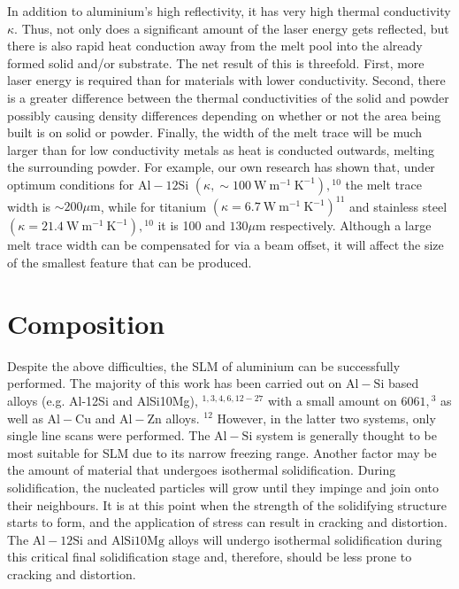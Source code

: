 \documentclass[10pt]{article}
\begin{document}
In addition to aluminium's high reflectivity, it has very high thermal conductivity $\kappa$. Thus, not only does a significant amount of the laser energy gets reflected, but there is also rapid heat conduction away from the melt pool into the already formed solid and/or substrate. The net result of this is threefold. First, more laser energy is required than for materials with lower conductivity. Second, there is a greater difference between the thermal conductivities of the solid and powder possibly causing density differences depending on whether or not the area being built is on solid or powder. Finally, the width of the melt trace will be much larger than for low conductivity metals as heat is conducted outwards, melting the surrounding powder. For example, our own research has shown that, under optimum conditions for $\mathrm{Al}-12 \mathrm{Si}$ $\left(\kappa, \sim 100 \mathrm{~W} \mathrm{~m}^{-1} \mathrm{~K}^{-1}\right),{ }^{10}$ the melt trace width is $\sim 200 \mu \mathrm{m}$, while for titanium $\left(\kappa=6.7 \mathrm{~W} \mathrm{~m}^{-1} \mathrm{~K}^{-1}\right)^{11}$ and stainless steel $\left(\kappa=21.4 \mathrm{~W} \mathrm{~m}^{-1} \mathrm{~K}^{-1}\right),{ }^{10}$ it is 100 and $130 \mu \mathrm{m}$ respectively. Although a large melt trace width can be compensated for via a beam offset, it will affect the size of the smallest feature that can be produced.

\section*{Composition}
Despite the above difficulties, the SLM of aluminium can be successfully performed. The majority of this work has been carried out on $\mathrm{Al}-\mathrm{Si}$ based alloys (e.g. Al-12Si and AlSi10Mg), ${ }^{1,3,4,6,12-27}$ with a small amount on $6061,{ }^{3}$ as well as $\mathrm{Al}-\mathrm{Cu}$ and $\mathrm{Al}-\mathrm{Zn}$ alloys. ${ }^{12}$ However, in the latter two systems, only single line scans were performed. The $\mathrm{Al}-\mathrm{Si}$ system is generally thought to be most suitable for SLM due to its narrow freezing range. Another factor may be the amount of material that undergoes isothermal solidification. During solidification, the nucleated particles will grow until they impinge and join onto their neighbours. It is at this point when the strength of the solidifying structure starts to form, and the application of stress can result in cracking and distortion. The $\mathrm{Al}-12 \mathrm{Si}$ and $\mathrm{AlSi} 10 \mathrm{Mg}$ alloys will undergo isothermal solidification during this critical final solidification stage and, therefore, should be less prone to cracking and distortion.
\end{document}

